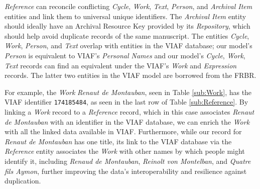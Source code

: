 \textit{Reference} can reconcile conflicting \textit{Cycle}, \textit{Work}, \textit{Text}, \textit{Person}, and \textit{Archival Item} entities and link them to universal unique identifiers. The \textit{Archival Item} entity should ideally have an Archival Resource Key provided by its \textit{Repository}, which should help avoid duplicate records of the same manuscript. The entities \textit{Cycle}, \textit{Work}, \textit{Person}, and \textit{Text} overlap with entities in the VIAF database; our model's \textit{Person} is equivalent to VIAF's \textit{Personal Names} and our model's \textit{Cycle}, \textit{Work}, \textit{Text} records can find an equivalent under the VIAF's \textit{Work} and \textit{Expression} records. The latter two entities in the VIAF model are borrowed from the FRBR.

For example, the \textit{Work} \textit{Renaut de Montauban}, seen in Table \ref{sub:Work}, has the VIAF identifier {\texttt{174185484}}, as seen in the last row of Table \ref{sub:Reference}. By linking a \textit{Work} record to a \textit{Reference} record, which in this case associates \textit{Renaut de Montauban} with an identifier in the VIAF database, we can enrich the \textit{Work} with all the linked data available in VIAF. Furthermore, while our record for \textit{Renaut de Montauban} has one title, its link to the VIAF database via the \textit{Reference} entity associates the \textit{Work} with other names by which people might identify it, including \textit{Renaud de Montauban}, \textit{Reinolt von Montelban}, and \textit{Quatre fils Aymon}, further improving the data's interoperability and resilience against duplication.


